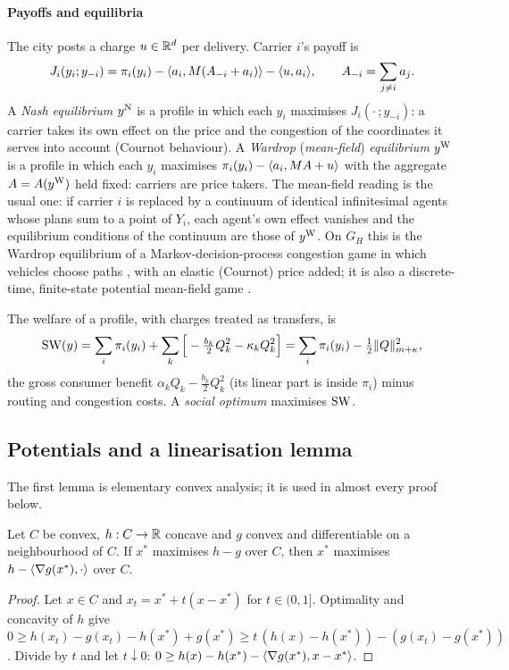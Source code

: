 \paragraph{Payoffs and equilibria} The city posts a charge $u\in\mathbb{R}^d$ per delivery. Carrier $i$'s payoff is
\begin{equation}\label{eq:payoff}
J_i(y_i;y_{-i})=\pi_i(y_i)-\langle a_i,M(A_{-i}+a_i)\rangle-\langle u,a_i\rangle,\qquad A_{-i}=\sum_{j\ne i}a_j .
\end{equation}
A \emph{Nash equilibrium} $y^{\mathrm{N}}$ is a profile in which each $y_i$ maximises $J_i(\cdot\,;y_{-i})$: a carrier takes its own effect on the price and the congestion of the coordinates it serves into account (Cournot behaviour). A \emph{Wardrop} (\emph{mean-field}) \emph{equilibrium} $y^{\mathrm{W}}$ is a profile in which each $y_i$ maximises $\pi_i(y_i)-\langle a_i,MA+u\rangle$ with the aggregate $A=A(y^{\mathrm{W}})$ held fixed: carriers are price takers. The mean-field reading is the usual one: if carrier $i$ is replaced by a continuum of identical infinitesimal agents whose plans sum to a point of $Y_i$, each agent's own effect vanishes and the equilibrium conditions of the continuum are those of $y^{\mathrm{W}}$. On $G_H$ this is the Wardrop equilibrium of a Markov-decision-process congestion game in which vehicles choose paths \citep{CalderoneSastry2017}, with an elastic (Cournot) price added; it is also a discrete-time, finite-state potential mean-field game \citep{GomesMohrSouza2010,Gueant2015}.

The welfare of a profile, with charges treated as transfers, is
\begin{equation}\label{eq:welfare}
\mathrm{SW}(y)=\sum_i\pi_i(y_i)+\sum_k\Big[-\tfrac{b_k}{2}Q_k^2-\kappa_kQ_k^2\Big]=\sum_i\pi_i(y_i)-\tfrac12\lVert Q\rVert_{m+\kappa}^2 ,
\end{equation}
the gross consumer benefit $\alpha_kQ_k-\tfrac{b_k}{2}Q_k^2$ (its linear part is inside $\pi_i$) minus routing and congestion costs. A \emph{social optimum} maximises $\mathrm{SW}$.

\subsection{Potentials and a linearisation lemma}
The first lemma is elementary convex analysis; it is used in almost every proof below.

\begin{lemma}[Linearisation]\label{lem:lin}
Let $C$ be convex, $h:C\to\mathbb{R}$ concave and $g$ convex and differentiable on a neighbourhood of $C$. If $x^*$ maximises $h-g$ over $C$, then $x^*$ maximises $h-\langle \nabla g(x^*),\cdot\rangle$ over $C$.
\end{lemma}
\begin{proof}
Let $x\in C$ and $x_t=x^*+t(x-x^*)$ for $t\in(0,1]$. Optimality and concavity of $h$ give $0\ge h(x_t)-g(x_t)-h(x^*)+g(x^*)\ge t\,(h(x)-h(x^*))-(g(x_t)-g(x^*))$. Divide by $t$ and let $t\downarrow0$: $0\ge h(x)-h(x^*)-\langle \nabla g(x^*),x-x^*\rangle$.
\end{proof}

